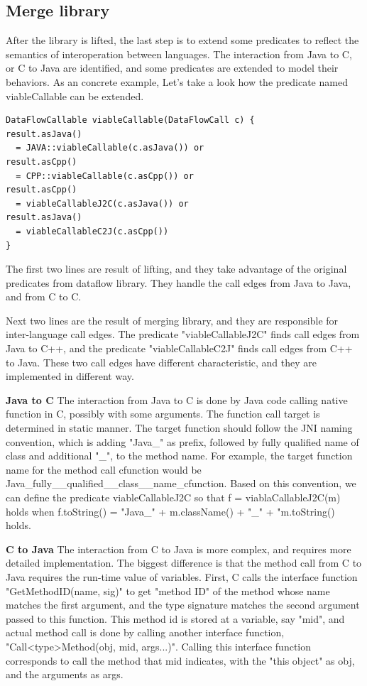\subsection{Merge library}

After the library is lifted, the last step is to extend some predicates to
reflect the semantics of interoperation between languages. The interaction from
Java to C, or C to Java are identified, and some predicates are extended to
model their behaviors. As an concrete example, Let's take a look how the predicate
named viableCallable can be extended.
\begin{lstlisting}[style=codeql,xleftmargin=2.5em]
DataFlowCallable viableCallable(DataFlowCall c) {
result.asJava()
  = JAVA::viableCallable(c.asJava()) or
result.asCpp()
  = CPP::viableCallable(c.asCpp()) or
result.asCpp()
  = viableCallableJ2C(c.asJava()) or
result.asJava()
  = viableCallableC2J(c.asCpp())
}
\end{lstlisting}
The first two lines are result of lifting, and they take advantage of the
original predicates from dataflow library.  They handle the call edges from
Java to Java, and from C to C.

Next two lines are the result of merging library, and they are responsible for
inter-language call edges.  The predicate "viableCallableJ2C" finds call edges
from Java to C++, and the predicate "viableCallableC2J" finds call edges from
C++ to Java. These two call edges have different characteristic, and they
are implemented in different way.

\textbf{Java to C} The interaction from Java to C is done by Java code
calling native function in C, possibly with some arguments. The function
call target is determined in static manner. The target function should
follow the JNI naming convention, which is adding "Java\_" as prefix, 
followed by fully qualified name of class and additional "\_", to the
method name. For example, the target function name for the method call
cfunction would be Java\_fully\_\_qualified\_\_class\_\_name\_cfunction.
Based on this convention, we can define the predicate viableCallableJ2C
so that f = viablaCallableJ2C(m) holds when f.toString() = "Java\_" + 
m.className() + "\_" + "m.toString() holds. 

\textbf{C to Java} The interaction from C to Java is more complex, and
requires more detailed implementation. The biggest difference is that
the method call from C to Java requires the run-time value of variables.
First, C calls the interface function "GetMethodID(name, sig)" to get "method
ID" of the method whose name matches the first argument, and the type signature
matches the second argument passed to this function. This method id is stored
at a variable, say "mid", and actual method call is done by calling another
interface function, "Call<type>Method(obj, mid, args...)". Calling this interface
function corresponds to call the method that mid indicates, with the "this object" as
obj, and the arguments as args.

